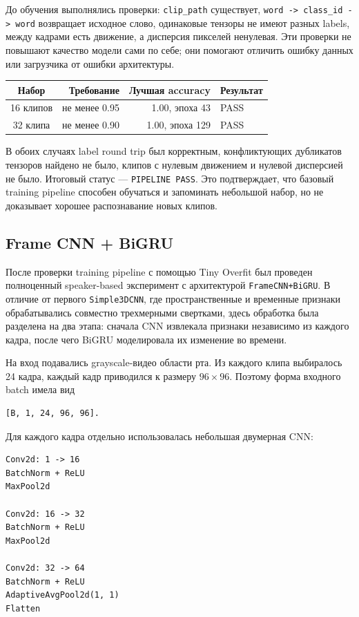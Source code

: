 \documentclass[12pt,a4paper]{article}
\begin{document}
До обучения выполнялись проверки: \texttt{clip\_path} существует,
\texttt{word -> class\_id -> word} возвращает исходное слово, одинаковые
тензоры не имеют разных labels, между кадрами есть движение, а дисперсия
пикселей ненулевая. Эти проверки не повышают качество модели сами по себе;
они помогают отличить ошибку данных или загрузчика от ошибки архитектуры.

\begin{table}[htbp]
\centering
\begin{tabular}{crrl}
\toprule
Набор & Требование & Лучшая accuracy & Результат \\
\midrule
16 клипов & не менее 0.95 & 1.00, эпоха 43 & PASS \\
32 клипа & не менее 0.90 & 1.00, эпоха 129 & PASS \\
\bottomrule
\end{tabular}
\end{table}

В обоих случаях label round trip был корректным, конфликтующих дубликатов
тензоров найдено не было, клипов с нулевым движением и нулевой дисперсией
не было. Итоговый статус --- \texttt{PIPELINE PASS}. Это подтверждает,
что базовый training pipeline способен обучаться и запоминать небольшой
набор, но не доказывает хорошее распознавание новых клипов.

\subsection{Frame CNN + BiGRU}

После проверки training pipeline с помощью Tiny Overfit был проведен
полноценный speaker-based эксперимент с архитектурой
\texttt{FrameCNN+BiGRU}. В отличие от первого \texttt{Simple3DCNN},
где пространственные и временные признаки обрабатывались совместно
трехмерными свертками, здесь обработка была разделена на два этапа:
сначала CNN извлекала признаки независимо из каждого кадра, после чего
BiGRU моделировала их изменение во времени.

На вход подавались grayscale-видео области рта. Из каждого клипа выбиралось
24 кадра, каждый кадр приводился к размеру $96\times96$. Поэтому форма
входного batch имела вид

\begin{verbatim}
[B, 1, 24, 96, 96].
\end{verbatim}

Для каждого кадра отдельно использовалась небольшая двумерная CNN:

\begin{verbatim}
Conv2d: 1 -> 16
BatchNorm + ReLU
MaxPool2d

Conv2d: 16 -> 32
BatchNorm + ReLU
MaxPool2d

Conv2d: 32 -> 64
BatchNorm + ReLU
AdaptiveAvgPool2d(1, 1)
Flatten
\end{verbatim}
\end{document}
